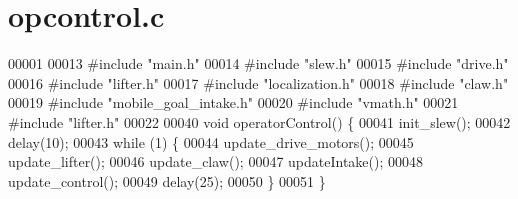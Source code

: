 \section{opcontrol.\+c}
\label{opcontrol_8c_source}

\begin{DoxyCode}
00001 
00013 \textcolor{preprocessor}{#include "main.h"}
00014 \textcolor{preprocessor}{#include "slew.h"}
00015 \textcolor{preprocessor}{#include "drive.h"}
00016 \textcolor{preprocessor}{#include "lifter.h"}
00017 \textcolor{preprocessor}{#include "localization.h"}
00018 \textcolor{preprocessor}{#include "claw.h"}
00019 \textcolor{preprocessor}{#include "mobile_goal_intake.h"}
00020 \textcolor{preprocessor}{#include "vmath.h"}
00021 \textcolor{preprocessor}{#include "lifter.h"}
00022 
00040 \textcolor{keywordtype}{void} operatorControl() \{
00041     init_slew();
00042     delay(10);
00043     \textcolor{keywordflow}{while} (1) \{
00044         update_drive_motors();
00045         update_lifter();
00046         update_claw();
00047         updateIntake();
00048         update_control();
00049         delay(25);
00050     \}
00051 \}
\end{DoxyCode}
